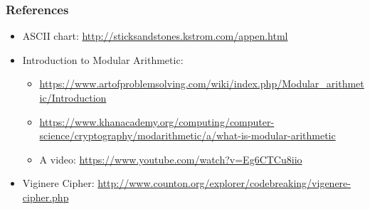 \documentclass{beamer}
\newcommand{\<}{\langle}
\renewcommand{\>}{\rangle}
\begin{document}
\begin{frame}
\frametitle{References}

\begin{itemize}
\item ASCII chart: \url{http://sticksandstones.kstrom.com/appen.html}
\item Introduction to Modular Arithmetic: 
	\begin{itemize}
	\item \url{https://www.artofproblemsolving.com/wiki/index.php/Modular_arithmetic/Introduction}
	\item \url{https://www.khanacademy.org/computing/computer-science/cryptography/modarithmetic/a/what-is-modular-arithmetic}
	\item A video: \url{https://www.youtube.com/watch?v=Eg6CTCu8iio}
	\end{itemize}
\item Viginere Cipher: \url{http://www.counton.org/explorer/codebreaking/vigenere-cipher.php}
\end{itemize}

\end{frame}
\end{document}

